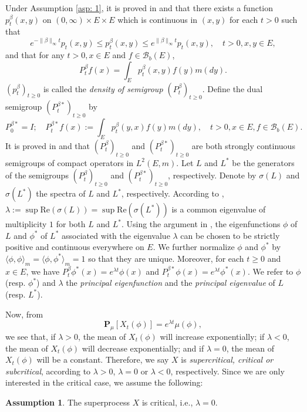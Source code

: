 \documentclass[12pt, a4paper]{amsart}
\theoremstyle{definition}
\newtheorem{asp}{Assumption}
\numberwithin{equation}{section}
\begin{document}
	Under Assumption \ref{asp: 1}, it is proved in \cite{RenSongZhang2015Limit} and \cite{RenSongZhang2017Central} that there exists a function $p^\beta_t(x,y)$ on $(0,\infty) \times E \times E$ which is continuous in $(x,y)$ for each $t>0$ such that
\begin{equation}
	e^{-\|\beta\|_\infty t} p_t(x,y)
	\leq p^{\beta}_t(x,y)
	\leq e^{\|\beta\|_\infty t} p_t(x,y),
	\quad t>0, x, y\in E,
\end{equation}
	and that for any $t>0, x\in E$ and $f \in \mathscr B_b(E)$,
\begin{equation}
	P^\beta_t f(x)
	= \int_E p_t^\beta (x,y) f(y) m(dy).
\end{equation}
    $(p^\beta_t)_{t\geq 0}$ is called the \emph{density of semigroup $(P^\beta_t)_{t\geq 0}$}.
	Define the dual semigroup $(P^{\beta *}_t)_{t \geq 0}$ by
\begin{equation}
	P^{\beta *}_0 = I;
	\quad P^{\beta *}_t f(x)
	:= \int_E p^\beta_t (y,x) f(y) m(dy),
	\quad t>0, x\in E, f\in \mathscr B_b(E).
\end{equation}
	It is proved in \cite{RenSongZhang2015Limit} and \cite{RenSongZhang2017Central} that $(P^\beta_t)_{t \geq 0}$ and $(P^{\beta *}_t)_{t \geq 0}$ are both strongly continuous semigroups of compact operators in $L^2(E,m)$.
	Let $L$ and $L^*$ be the generators of the semigroups $(P^\beta_t)_{t \geq 0}$ and $(P^{\beta *}_t)_{t \geq 0}$, respectively.
	Denote by $\sigma(L)$ and $\sigma(L^*)$ the spectra of $L$ and $L^*$, respectively.
	According to \cite[Theorem V.6.6.]{Schaefer1974Banach}, $\lambda := \sup \text{Re}(\sigma(L)) = \sup \text{Re}(\sigma(L^*))$ is a common eigenvalue of multiplicity $1$ for both $L$ and $L^*$.
	Using the argument in \cite{RenSongZhang2015Limit}, the eigenfunctions $\phi$ of $L$ and $\phi^*$ of $L^*$ associated with the eigenvalue $\lambda$ can be chosen to be strictly positive and continuous everywhere on $E$.
	We further normalize $\phi$ and $\phi^*$ by $\langle\phi, \phi\rangle_m = \langle\phi,\phi^*\rangle_m = 1$ so that they are unique.
	Moreover, for each $t\geq 0$ and $x\in E$, we have $P^\beta_t \phi^*(x) = e^{\lambda t} \phi(x)$ and $P^{\beta *}_t \phi(x) = e^{\lambda t} \phi^*(x)$.
	We refer to $\phi$ (resp. $\phi^*$) and $\lambda$ the \emph{principal eigenfunction} and the \emph{principal eigenvalue} of $L$ (resp. $L^*$).
	
	Now, from
\begin{equation}
	\mathbf P_\mu[X_t(\phi)]
	= e^{\lambda t} \mu(\phi),
\end{equation}
	we see that, if $\lambda > 0$, the mean of $X_t(\phi)$ will increase exponentially; if $\lambda < 0$, the mean of $X_t(\phi)$ will decrease exponentially; and if $\lambda = 0$, the mean of $X_t(\phi)$ will be a constant.
	Therefore, we say $X$ is \emph{supercritical, critical or subcritical}, according to $\lambda > 0$, $\lambda = 0$ or $\lambda < 0$, respectively.
	Since we are only interested in the critical case, we assume the following:
\begin{asp} \label{asp: 2}
    The superprocess $X$ is critical, i.e., $\lambda = 0$.
\end{asp}
\end{document}
